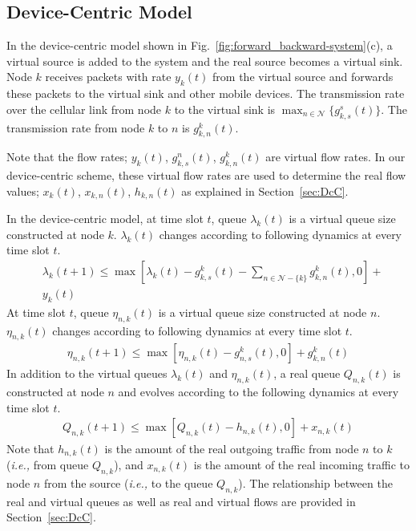 \documentclass[conference]{IEEEtran}
\newcommand{\ie}{{\em i.e., }}
\newcommand{\Nset}{\mathcal{N}}
\begin{document}
\subsection{Device-Centric Model}
In the device-centric model shown in Fig.~\ref{fig:forward_backward-system}(c), a virtual source is added to the system and the real source becomes a virtual sink. Node $k$ receives packets with rate $y_k(t)$ from the virtual source and forwards these packets to the virtual sink and other mobile devices. The transmission rate over the cellular link from node $k$ to the virtual sink is $\max_{n \in \Nset}\{g_{k,s}^{s}(t)\}$. The transmission rate from node $k$ to $n$ is $g_{k,n}^{k}(t)$.

Note that the flow rates; $y_k(t)$, $g_{k,s}^{n}(t)$, $g_{k,n}^{k}(t)$ are virtual flow rates. In our device-centric scheme, these virtual flow rates are used to determine the real flow values; $x_k(t)$, $x_{k,n}(t)$, $h_{k,n}(t)$ as explained in Section~\ref{sec:DcC}.

In the device-centric model, at time slot $t$, queue $\lambda_{k}(t)$ is a virtual queue size constructed at node $k$. $\lambda_{k}(t)$ changes according to following dynamics at every time slot $t$.
\begin{align} \label{eq:lambda_queue_evolution}
& {\lambda}_{k}(t+1) \leq  \max [{\lambda}_{k}(t) - {g}_{k,s}^{k}(t) - \sum_{n \in \Nset - \{k\}} {g}_{k,n}^{k}(t), 0] + \nonumber \\
& {y}_{k}(t)
\end{align} At time slot $t$, queue $\eta_{n,k}(t)$ is a virtual queue size constructed at node $n$. $\eta_{n,k}(t)$ changes according to following dynamics at every time slot $t$.
\begin{align} \label{eq:eta_queue_evolution}
{\eta}_{n,k}(t+1) \leq \max [{\eta}_{n,k}(t) - {g}_{n,s}^{k}(t), 0] + {g}_{k,n}^{k}(t)
\end{align} In addition to the virtual queues $\lambda_{k}(t)$ and $\eta_{n,k}(t)$, a real queue $Q_{n,k}(t)$ is constructed at node $n$ and evolves according to the following dynamics at every time slot $t$.
\begin{align} \label{eq:real_queue_evolution}
Q_{n,k}(t+1) \leq \max [Q_{n,k}(t) - {h}_{n,k}(t), 0] + {x}_{n,k}(t)
\end{align} Note that ${h}_{n,k}(t)$ is the amount of the real outgoing traffic from node $n$ to $k$ (\ie from queue $Q_{n,k}$), and ${x}_{n,k}(t)$ is the amount of the real incoming traffic to node $n$ from the source (\ie to the queue $Q_{n,k}$). The relationship between the real and virtual queues as well as real and virtual flows are provided in Section~\ref{sec:DcC}.
\end{document}
